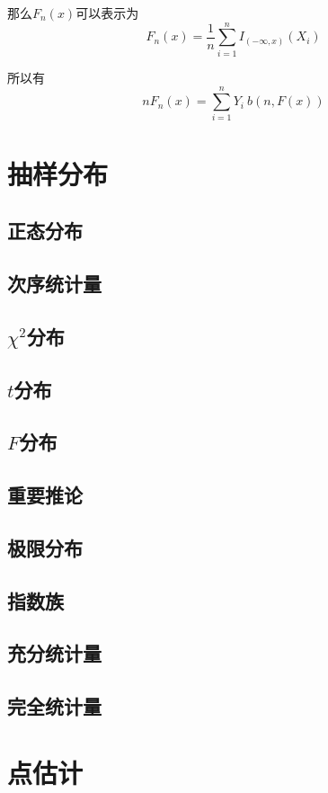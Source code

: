 \documentclass[UTF8]{ctexart}
\begin{document}
那么$F_{n}(x)$可以表示为
$$F_{n}(x)=\frac{1}{n}\sum_{i=1}^{n}I_{(-\infty ,x)}(X_{i}) $$

所以有
$$nF_{n}(x)=\sum_{i=1}^{n}Y_{i}~b(n,F(x)) $$





\section{抽样分布}

\subsection{正态分布}

\subsection{次序统计量}

\subsection{$\chi^{2} $分布}

\subsection{$t$分布}

\subsection{$F$分布}

\subsection{重要推论}

\subsection{极限分布}

\subsection{指数族}

\subsection{充分统计量}

\subsection{完全统计量}

\section{点估计}
\end{document}
